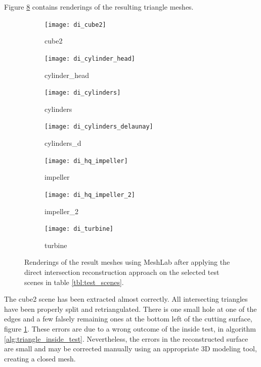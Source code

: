 Figure \ref{fig:di_results} contains renderings of the resulting triangle meshes.
%
\begin{figure}[!]
	\centering
	\begin{subfigure}[b]{0.34\textwidth}
		\centering
		\texttt{[image: di\_cube2]}
		\caption{cube2}
		\label{fig:di_cube2}
	\end{subfigure}
	\hspace{1cm}
	\begin{subfigure}[b]{0.34\textwidth}
		\centering
		\texttt{[image: di\_cylinder\_head]}
		\caption{cylinder\_head}
		\label{fig:di_cylinder_head}
	\end{subfigure}
	\begin{subfigure}[b]{0.34\textwidth}
		\centering
		\texttt{[image: di\_cylinders]}
		\caption{cylinders}
		\label{fig:di_cylinders}
	\end{subfigure}
	\hspace{1cm}
	\begin{subfigure}[b]{0.34\textwidth}
		\centering
		\texttt{[image: di\_cylinders\_delaunay]}
		\caption{cylinders\_d}
		\label{fig:di_cylinders_d}
	\end{subfigure}
	\begin{subfigure}[b]{0.34\textwidth}
		\centering
		\texttt{[image: di\_hq\_impeller]}
		\caption{impeller}
		\label{fig:di_impeller}
	\end{subfigure}
	\hspace{1cm}
	\begin{subfigure}[b]{0.34\textwidth}
		\centering
		\texttt{[image: di\_hq\_impeller\_2]}
		\caption{impeller\_2}
		\label{fig:di_impeller_2}
	\end{subfigure}
	\begin{subfigure}[b]{0.33\textwidth}
		\centering
		\texttt{[image: di\_turbine]}
		\caption{turbine}
		\label{fig:di_turbine}
	\end{subfigure}
	\caption{
		Renderings of the result meshes using MeshLab after applying the direct intersection reconstruction approach on the selected test scenes in table \ref{tbl:test_scenes}.
	}
	\label{fig:di_results}
\end{figure}
%
The cube2 scene has been extracted almost correctly.
All intersecting triangles have been properly split and retriangulated.
There is one small hole at one of the edges and a few falsely remaining ones at the bottom left of the cutting surface, \cf figure \ref{fig:di_cube2}.
These errors are due to a wrong outcome of the inside test, \cf {} in algorithm \ref{alg:triangle_inside_test}.
Nevertheless, the errors in the reconstructed surface are small and may be corrected manually using an appropriate 3D modeling tool, creating a closed mesh.

